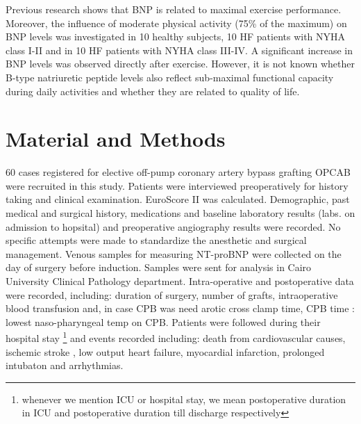 \documentclass[14pt,a4paper,onecolumn]{extarticle}
\begin{document}
Previous research shows that BNP is related to maximal exercise performance. \citep{Kruger2002} Moreover, the influence of moderate physical activity (75\% of the maximum) on BNP levels was investigated in 10 healthy subjects, 10 HF patients with NYHA class I-II and in 10 HF patients with NYHA class III-IV. A significant increase in BNP levels was observed directly after exercise. \citep{McNairy2002} However, it is not known whether B-type natriuretic peptide levels also reflect sub-maximal functional capacity during daily activities and whether they are related to quality of life.


%


\clearpage
\section{Material and Methods}


60 cases registered for elective off-pump coronary artery bypass grafting OPCAB were recruited in this study. Patients were interviewed preoperatively for history taking and clinical examination. EuroScore II was calculated. Demographic, past medical and surgical history, medications and baseline laboratory results (labs. on admission to hopsital) and preoperative angiography results were recorded.  No specific attempts were made to standardize the anesthetic and surgical management.  Venous samples for measuring NT-proBNP were collected on the day of surgery before induction. Samples were sent for analysis in Cairo University Clinical Pathology department. Intra-operative and postoperative data were recorded, including: duration of surgery, number of grafts, intraoperative blood transfusion and, in case CPB was need arotic cross clamp time, CPB time : lowest naso-pharyngeal temp on CPB.  Patients were followed during their hospital stay \footnote{whenever we mention ICU or hospital stay, we mean postoperative duration in ICU and postoperative duration till discharge respectively} and events recorded including: death from cardiovascular causes, ischemic stroke , low output heart failure,  myocardial infarction, prolonged intubaton and arrhythmias.
\end{document}
